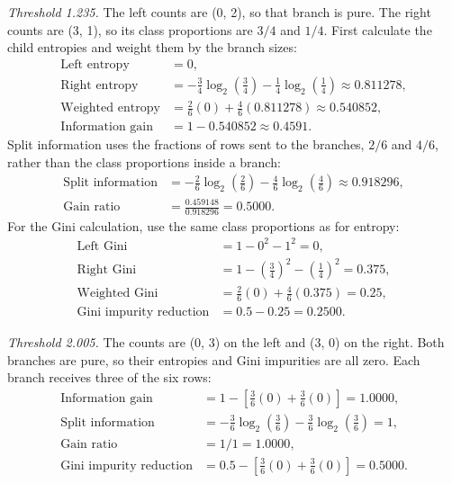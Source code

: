 \documentclass[11pt,letterpaper]{article}
\begin{document}
\textit{Threshold 1.235.}
The left counts are (0, 2), so that branch is pure. The right counts are
(3, 1), so its class proportions are $3/4$ and $1/4$. First calculate the
child entropies and weight them by the branch sizes:
\begin{align*}
\text{Left entropy} &= 0,\\
\text{Right entropy} &= -\tfrac34\log_2(\tfrac34)-\tfrac14\log_2(\tfrac14)
\approx 0.811278,\\
\text{Weighted entropy} &= \tfrac26(0)+\tfrac46(0.811278)\approx0.540852,\\
\text{Information gain} &= 1-0.540852\approx\boxed{0.4591}.
\end{align*}
Split information uses the fractions of rows sent to the branches, $2/6$
and $4/6$, rather than the class proportions inside a branch:
\begin{align*}
\text{Split information} &= -\tfrac26\log_2(\tfrac26)-\tfrac46\log_2(\tfrac46)
\approx0.918296,\\
\text{Gain ratio} &= \frac{0.459148}{0.918296}=\boxed{0.5000}.
\end{align*}
For the Gini calculation, use the same class proportions as for entropy:
\begin{align*}
\text{Left Gini} &= 1-0^2-1^2=0,\\
\text{Right Gini} &= 1-(\tfrac34)^2-(\tfrac14)^2=0.375,\\
\text{Weighted Gini} &= \tfrac26(0)+\tfrac46(0.375)=0.25,\\
\text{Gini impurity reduction} &= 0.5-0.25=\boxed{0.2500}.
\end{align*}

\textit{Threshold 2.005.}
The counts are (0, 3) on the left and (3, 0) on the right. Both branches
are pure, so their entropies and Gini impurities are all zero. Each branch
receives three of the six rows:
\begin{align*}
\text{Information gain} &= 1-[\tfrac36(0)+\tfrac36(0)]=\boxed{1.0000},\\
\text{Split information} &= -\tfrac36\log_2(\tfrac36)-\tfrac36\log_2(\tfrac36)=1,\\
\text{Gain ratio} &= 1/1=\boxed{1.0000},\\
\text{Gini impurity reduction} &= 0.5-[\tfrac36(0)+\tfrac36(0)]=\boxed{0.5000}.
\end{align*}
\end{document}
